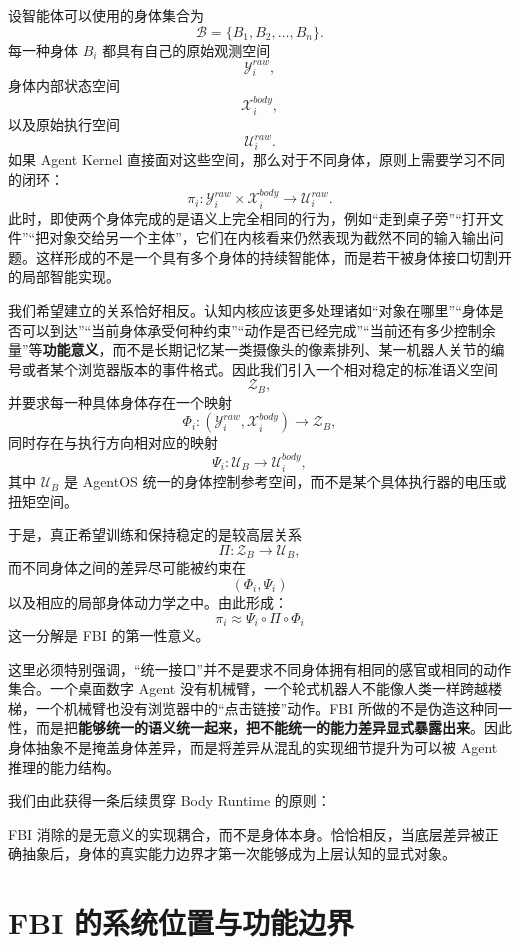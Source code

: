 设智能体可以使用的身体集合为
\[
\mathcal B
=
\{B_1,B_2,\ldots,B_n\}.
\]
每一种身体 \(B_i\) 都具有自己的原始观测空间
\[
\mathcal Y_i^{raw},
\]
身体内部状态空间
\[
\mathcal X_i^{body},
\]
以及原始执行空间
\[
\mathcal U_i^{raw}.
\]
如果 Agent Kernel 直接面对这些空间，那么对于不同身体，原则上需要学习不同的闭环：
\[
\pi_i:
\mathcal Y_i^{raw}
\times
\mathcal X_i^{body}
\rightarrow
\mathcal U_i^{raw}.
\]
此时，即使两个身体完成的是语义上完全相同的行为，例如“走到桌子旁”“打开文件”“把对象交给另一个主体”，它们在内核看来仍然表现为截然不同的输入输出问题。这样形成的不是一个具有多个身体的持续智能体，而是若干被身体接口切割开的局部智能实现。

我们希望建立的关系恰好相反。认知内核应该更多处理诸如“对象在哪里”“身体是否可以到达”“当前身体承受何种约束”“动作是否已经完成”“当前还有多少控制余量”等\textbf{功能意义}，而不是长期记忆某一类摄像头的像素排列、某一机器人关节的编号或者某个浏览器版本的事件格式。因此我们引入一个相对稳定的标准语义空间
\[
\mathcal Z_B,
\]
并要求每一种具体身体存在一个映射
\[
\Phi_i:
(\mathcal Y_i^{raw},\mathcal X_i^{body})
\rightarrow
\mathcal Z_B,
\]
同时存在与执行方向相对应的映射
\[
\Psi_i:
\mathcal U_B
\rightarrow
\mathcal U_i^{body},
\]
其中 \(\mathcal U_B\) 是 AgentOS 统一的身体控制参考空间，而不是某个具体执行器的电压或扭矩空间。

于是，真正希望训练和保持稳定的是较高层关系
\[
\Pi:
\mathcal Z_B
\rightarrow
\mathcal U_B,
\]
而不同身体之间的差异尽可能被约束在
\[
(\Phi_i,\Psi_i)
\]
以及相应的局部身体动力学之中。由此形成：
\[
\boxed{
\pi_i
\approx
\Psi_i
\circ
\Pi
\circ
\Phi_i
}
\]
这一分解是 FBI 的第一性意义。

这里必须特别强调，“统一接口”并不是要求不同身体拥有相同的感官或相同的动作集合。一个桌面数字 Agent 没有机械臂，一个轮式机器人不能像人类一样跨越楼梯，一个机械臂也没有浏览器中的“点击链接”动作。FBI 所做的不是伪造这种同一性，而是把\textbf{能够统一的语义统一起来，把不能统一的能力差异显式暴露出来}。因此身体抽象不是掩盖身体差异，而是将差异从混乱的实现细节提升为可以被 Agent 推理的能力结构。

我们由此获得一条后续贯穿 Body Runtime 的原则：
\begin{statementbox}
\centering
{}
\end{statementbox}
FBI 消除的是无意义的实现耦合，而不是身体本身。恰恰相反，当底层差异被正确抽象后，身体的真实能力边界才第一次能够成为上层认知的显式对象。


\section{FBI 的系统位置与功能边界}

